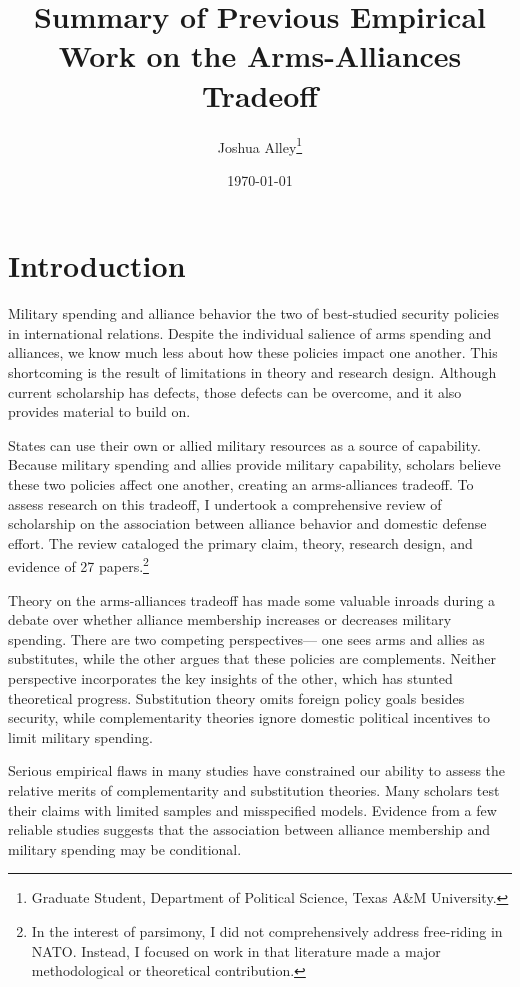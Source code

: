 \documentclass[12pt]{article}
\title{\textbf{Summary of Previous Empirical Work on the Arms-Alliances Tradeoff}}
\author{Joshua Alley\footnote{Graduate Student,
Department of Political Science, Texas A\&M University.}}
\date{{\normalsize \today}}
\begin{document}
\maketitle 


\section*{Introduction}

Military spending and alliance behavior the two of best-studied security policies in international relations. Despite the individual salience of arms spending and alliances, we know much less about how these policies impact one another. This shortcoming is the result of limitations in theory and research design. Although current scholarship has defects, those defects can be overcome, and it also provides material to build on.    

States can use their own or allied military resources as a source of capability. Because military spending and allies provide military capability, scholars believe these two policies affect one another, creating an arms-alliances tradeoff. To assess research on this tradeoff, I undertook a comprehensive review of scholarship on the association between alliance behavior and domestic defense effort. The review cataloged the primary claim, theory, research design, and evidence of 27 papers.\footnote{In the interest of parsimony, I did not comprehensively address free-riding in NATO. Instead, I focused on work in that literature made a major methodological or theoretical contribution.} 
 
Theory on the arms-alliances tradeoff has made some valuable inroads during a debate over whether alliance membership increases or decreases military spending. There are two competing perspectives--- one sees arms and allies as substitutes, while the other argues that these policies are complements. Neither perspective incorporates the key insights of the other, which has stunted theoretical progress. Substitution theory omits foreign policy goals besides security, while complementarity theories ignore domestic political incentives to limit military spending. 

Serious empirical flaws in many studies have constrained our ability to assess the relative merits of complementarity and substitution theories. Many scholars test their claims with limited samples and misspecified models. Evidence from a few reliable studies suggests that the association between alliance membership and military spending may be conditional. 
\end{document}
